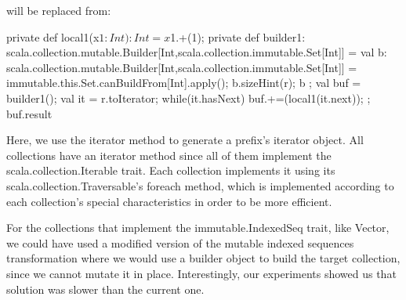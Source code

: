 will be replaced from:

{
  private def local1(x$1: Int): Int = x$1.+(1);
  private def builder1:
scala.collection.mutable.Builder[Int,scala.collection.immutable.Set[Int]] = {
    val b:
scala.collection.mutable.Builder[Int,scala.collection.immutable.Set[Int]] =
immutable.this.Set.canBuildFrom[Int].apply();
    b.sizeHint(r);
    b
  };
  val buf = builder1();
  val it = r.toIterator;
  while(it.hasNext){
    buf.+=(local1(it.next));
  };
  buf.result
}


Here, we use the iterator method to generate a prefix's iterator object. All
collections have an iterator method since all of them implement the
scala.collection.Iterable trait. Each collection implements it using its
scala.collection.Traversable's foreach method, which is implemented according to
each collection's special characteristics in order to be more efficient.

For the collections that implement the immutable.IndexedSeq trait, like Vector,
we could have used a modified version of the mutable indexed sequences
transformation where we would use a builder object to build the target
collection, since we cannot mutate it in place. Interestingly, our experiments
showed us that solution was slower than the current one.